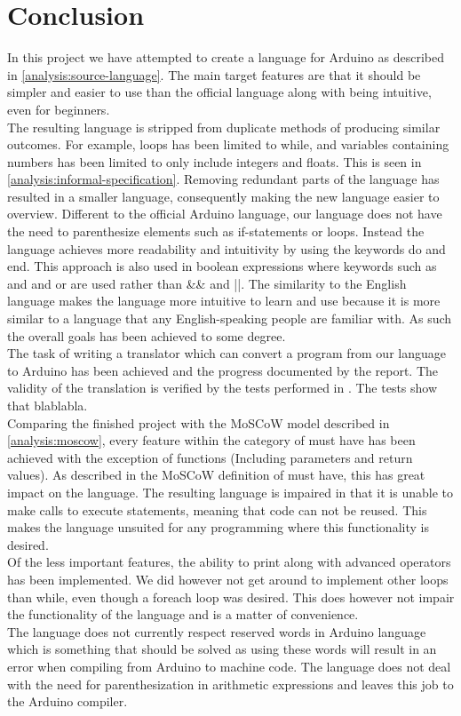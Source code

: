 \section{Conclusion}

In this project we have attempted to create a language for Arduino as described in \ref{analysis:source-language}. The main target features are that it should be simpler and easier to use than the official language along with being intuitive, even for beginners. \\
The resulting language is stripped from duplicate methods of producing similar outcomes. For example, loops has been limited to while, and variables containing numbers has been limited to only include integers and floats. This is seen in \ref{analysis:informal-specification}. Removing redundant parts of the language has resulted in a smaller language, consequently making the new language easier to overview. Different to the official Arduino language, our language does not have the need to parenthesize elements such as if-statements or loops. Instead the language achieves more readability and intuitivity by using the keywords do and end. This approach is also used in boolean expressions where keywords such as and and or are used rather than \&\& and  ||. The similarity to the English language makes the language more intuitive to learn and use because it is more similar to a language that any English-speaking people are familiar with. As such the overall goals has been achieved to some degree. \\
The task of writing a translator which can convert a program from our language to Arduino has been achieved and the progress documented by the report. The validity of the translation is verified by the tests performed in . The tests show that blablabla. \\
Comparing the finished project with the MoSCoW model described in \ref{analysis:moscow}, every feature within the category of must have has been achieved with the exception of functions (Including parameters and return values). As described in the MoSCoW definition of must have, this has great impact on the language. The resulting language is impaired in that it is unable to make calls to execute statements, meaning that code can not be reused. This makes the language unsuited for any programming where this functionality is desired. \\
Of the less important features, the ability to print along with advanced operators has been implemented. We did however not get around to implement other loops than while, even though a foreach loop was desired. This does however not impair the functionality of the language and is a matter of convenience. \\
The language does not currently respect reserved words in Arduino language which is something that should be solved as using these words will result in an error when compiling from Arduino to machine code. The language does not deal with the need for parenthesization in arithmetic expressions and leaves this job to the Arduino compiler.

